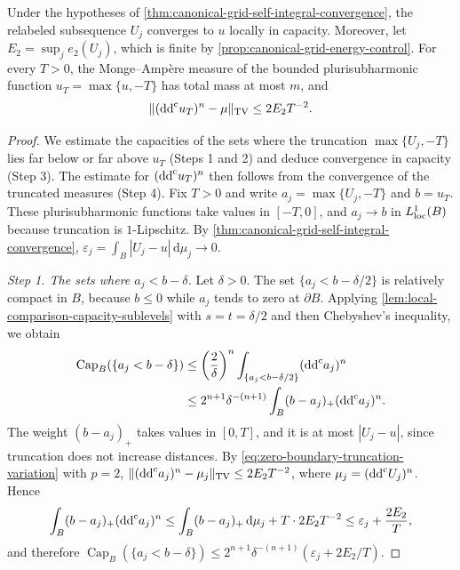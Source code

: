 
\begin{theorem}\label{thm:canonical-grid-capacity-convergence}
Under the hypotheses of \cref{thm:canonical-grid-self-integral-convergence}, the relabeled subsequence $U_j$ converges to $u$ locally in capacity. Moreover, let $E_2=\sup_je_2(U_j)$, which is finite by \cref{prop:canonical-grid-energy-control}. For every $T>0$, the Monge--Amp\`ere measure of the bounded plurisubharmonic function $u_T=\max\{u,-T\}$ has total mass at most $m$, and
\begin{equation}\label{eq:canonical-grid-truncated-measure-limit}
 \|(\mathrm{dd}^{\mathrm{c}} u_T)^n-\mu\|_{\mathrm{TV}}\leq2E_2T^{-2}.
\end{equation}
\end{theorem}
\begin{proof}
We estimate the capacities of the sets where the truncation $\max\{U_j,-T\}$ lies far below or far above $u_T$ (Steps 1 and 2) and deduce convergence in capacity (Step 3). The estimate for $(\mathrm{dd}^{\mathrm{c}} u_T)^n$ then follows from the convergence of the truncated measures (Step 4). Fix $T>0$ and write $a_j=\max\{U_j,-T\}$ and $b=u_T$. These plurisubharmonic functions take values in $[-T,0]$, and $a_j\to b$ in $L^1_{\mathrm{loc}}(B)$ because truncation is $1$-Lipschitz. By \cref{thm:canonical-grid-self-integral-convergence}, $\varepsilon_j=\int_B|U_j-u|\,\mathrm d\mu_j\to0$.

\emph{Step 1. The sets where $a_j<b-\delta$.}
Let $\delta>0$. The set $\{a_j<b-\delta/2\}$ is relatively compact in $B$, because $b\leq0$ while $a_j$ tends to zero at $\partial B$. Applying \cref{lem:local-comparison-capacity-sublevels} with $s=t=\delta/2$ and then Chebyshev's inequality, we obtain
\[
 \begin{aligned}
 \operatorname{Cap}_B(\{a_j<b-\delta\})
 &\leq\left(\frac2\delta\right)^n\int_{\{a_j<b-\delta/2\}}(\mathrm{dd}^{\mathrm{c}} a_j)^n\\
 &\leq2^{n+1}\delta^{-(n+1)}\int_B(b-a_j)_+(\mathrm{dd}^{\mathrm{c}} a_j)^n.
 \end{aligned}
\]
The weight $(b-a_j)_+$ takes values in $[0,T]$, and it is at most $|U_j-u|$, since truncation does not increase distances. By \eqref{eq:zero-boundary-truncation-variation} with $p=2$, $\|(\mathrm{dd}^{\mathrm{c}} a_j)^n-\mu_j\|_{\mathrm{TV}}\leq2E_2T^{-2}$, where $\mu_j=(\mathrm{dd}^{\mathrm{c}} U_j)^n$. Hence
\[
 \int_B(b-a_j)_+(\mathrm{dd}^{\mathrm{c}} a_j)^n
 \leq\int_B(b-a_j)_+\,\mathrm d\mu_j+T\cdot2E_2T^{-2}
 \leq\varepsilon_j+\frac{2E_2}T,
\]
and therefore $\operatorname{Cap}_B(\{a_j<b-\delta\})\leq2^{n+1}\delta^{-(n+1)}(\varepsilon_j+2E_2/T)$.


\end{proof}
